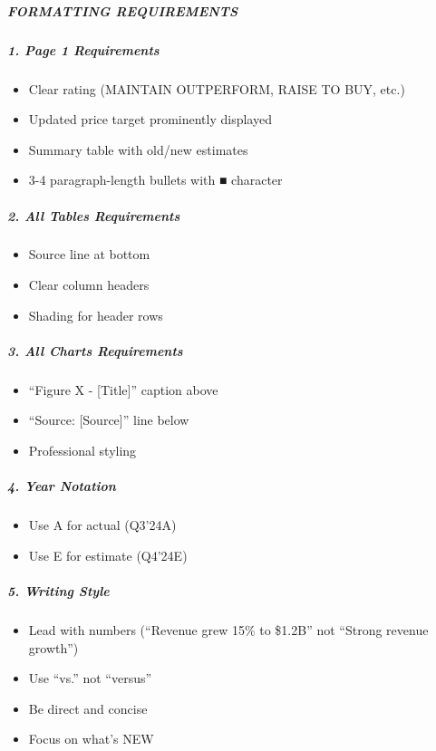 \documentclass[11pt]{article}
\begin{document}
\subparagraph{FORMATTING REQUIREMENTS}\mbox{}\par

\subparagraph{1. Page 1 Requirements}\mbox{}\par
\begin{itemize}[leftmargin=*,itemsep=2pt,topsep=2pt]
\item {} Clear rating (MAINTAIN OUTPERFORM, RAISE TO BUY, etc.)
\item {} Updated price target prominently displayed
\item {} Summary table with old/new estimates
\item {} 3-4 paragraph-length bullets with ■ character
\end{itemize}

\subparagraph{2. All Tables Requirements}\mbox{}\par
\begin{itemize}[leftmargin=*,itemsep=2pt,topsep=2pt]
\item {} Source line at bottom
\item {} Clear column headers
\item {} Shading for header rows
\end{itemize}

\subparagraph{3. All Charts Requirements}\mbox{}\par
\begin{itemize}[leftmargin=*,itemsep=2pt,topsep=2pt]
\item {} ``Figure X - [Title]'' caption above
\item {} ``Source: [Source]'' line below
\item {} Professional styling
\end{itemize}

\subparagraph{4. Year Notation}\mbox{}\par
\begin{itemize}[leftmargin=*,itemsep=2pt,topsep=2pt]
\item {} Use A for actual (Q3'24A)
\item {} Use E for estimate (Q4'24E)
\end{itemize}

\subparagraph{5. Writing Style}\mbox{}\par
\begin{itemize}[leftmargin=*,itemsep=2pt,topsep=2pt]
\item {} Lead with numbers (``Revenue grew 15\% to \$1.2B'' not ``Strong revenue growth'')
\item {} Use ``vs.'' not ``versus''
\item {} Be direct and concise
\item {} Focus on what's NEW
\end{itemize}
\end{document}
